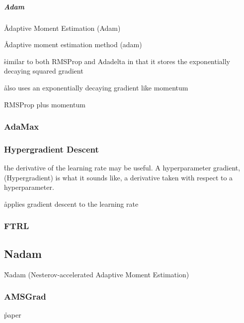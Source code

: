\subparagraph{Adam}

\r{Adaptive Moment Estimation (Adam)~\cite{kingma2014adam}}

\r{Adaptive moment estimation method (adam)}

\r{similar to both RMSProp and Adadelta in that it stores the exponentially decaying squared gradient}

\r{also uses an exponentially decaying gradient like momentum}

\r{RMSProp plus momentum}


\subsubsection{AdaMax}


\subsubsection{Hypergradient Descent}


\r{the derivative of the learning rate may be useful. A hyperparameter gradient, (Hypergradient) is what it sounds like, a derivative taken with respect to a hyperparameter.}

\r{applies gradient descent to the learning rate}



\subsubsection{FTRL}



\subsection{Nadam}

\r{Nadam (Nesterov-accelerated Adaptive Moment Estimation)~\cite{dozat2016incorporating}}


\subsubsection{AMSGrad}

\r{paper\cite{reddi2019convergence}}


